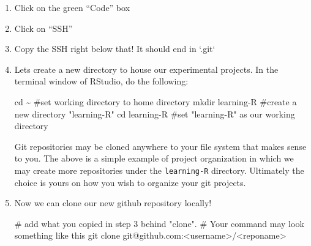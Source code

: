 \documentclass[
  letterpaper,
  DIV=11,
  numbers=noendperiod]{scrreprt}
\newenvironment{Shaded}{\begin{snugshade}}{\end{snugshade}}
\newcommand{\BuiltInTok}[1]{\textcolor[rgb]{0.00,0.23,0.31}{#1}}
\newcommand{\CommentTok}[1]{\textcolor[rgb]{0.37,0.37,0.37}{#1}}
\newcommand{\FunctionTok}[1]{\textcolor[rgb]{0.28,0.35,0.67}{#1}}
\newcommand{\NormalTok}[1]{\textcolor[rgb]{0.00,0.23,0.31}{#1}}
\newcommand{\OperatorTok}[1]{\textcolor[rgb]{0.37,0.37,0.37}{#1}}
\begin{document}
\begin{enumerate}
\def\labelenumi{\arabic{enumi}.}
\item
  Click on the green ``Code'' box
\item
  Click on ``SSH''
\item
  Copy the SSH right below that! It should end in `.git`
\item
  Lets create a new directory to house our experimental projects. In the
  terminal window of RStudio, do the following:

\begin{Shaded}
\begin{Highlighting}[]
\BuiltInTok{cd}\NormalTok{ \textasciitilde{}                 }\CommentTok{\#set working directory to home directory}
\FunctionTok{mkdir}\NormalTok{ learning{-}R     }\CommentTok{\#create a new directory "learning{-}R"}
\BuiltInTok{cd}\NormalTok{ learning{-}R        }\CommentTok{\#set "learning{-}R" as our working directory}
\end{Highlighting}
\end{Shaded}

  \begin{tcolorbox}[enhanced jigsaw, bottomtitle=1mm, bottomrule=.15mm, toprule=.15mm, opacityback=0, leftrule=.75mm, breakable, colback=white, toptitle=1mm, left=2mm, coltitle=black, titlerule=0mm, opacitybacktitle=0.6, title=\textcolor{quarto-callout-note-color}{\faInfo}\hspace{0.5em}{Git Project Organization}, rightrule=.15mm, arc=.35mm, colframe=quarto-callout-note-color-frame, colbacktitle=quarto-callout-note-color!10!white]

  Git repositories may be cloned anywhere to your file system that makes
  sense to you. The above is a simple example of project organization in
  which we may create more repositories under the \texttt{learning-R}
  directory. Ultimately the choice is yours on how you wish to organize
  your git projects.

  \end{tcolorbox}
\item
  Now we can clone our new github repository locally!

\begin{Shaded}
\begin{Highlighting}[]
\CommentTok{\# add what you copied in step 3 behind "clone".}
\CommentTok{\# Your command may look something like this}
\FunctionTok{git}\NormalTok{ clone git@github.com:}\OperatorTok{\textless{}}\NormalTok{username}\OperatorTok{\textgreater{}}\NormalTok{/}\OperatorTok{\textless{}}\NormalTok{reponame}\OperatorTok{\textgreater{}}
\end{Highlighting}
\end{Shaded}
\end{enumerate}
\end{document}
